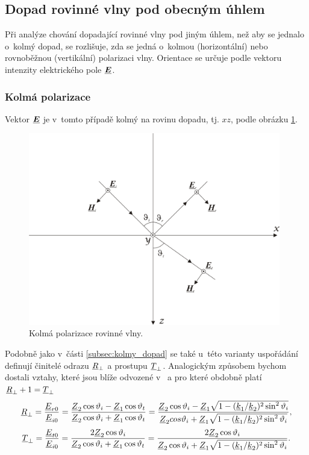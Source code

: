 \subsection{Dopad rovinné vlny pod obecným úhlem}
Při analýze chování dopadající rovinné vlny pod jiným úhlem, než aby se jednalo o~kolmý dopad, se rozlišuje, zda se jedná o~kolmou (horizontální) nebo rovnoběžnou (vertikální) polarizaci vlny. Orientace se určuje podle vektoru intenzity elektrického pole $\mbox{\underline{\boldmath$E$}}$.
\subsubsection*{Kolmá polarizace}
Vektor $\mbox{\underline{\boldmath$E$}}$ je v~tomto případě kolmý na rovinu dopadu, tj. $xz$, podle obrázku \ref{obr:evlny_kolma_polarizace}.
\begin{figure}[!h]
	\centering
	\includegraphics[width=11cm]{evlny_kolma_polarizace.png}
	\caption{Kolmá polarizace rovinné vlny. \cite{emp}}
	\label{obr:evlny_kolma_polarizace}
\end{figure}
Podobně jako v~části \ref{subsec:kolmy_dopad} se také u~této varianty uspořádání definují činitelé odrazu ${\underline{R}}_{\perp}$ a prostupu ${\underline{T}}_{\perp}$. Analogickým způsobem bychom dostali vztahy, které jsou blíže odvozené v~\cite[str. 94]{emp} a pro které obdobně platí ${\underline{R}}_{\perp} + 1 = {\underline{T}}_{\perp}$
\begin{equation}
	{\underline{R}}_{\perp} = \frac{{\underline{E}}_{r0}}{{\underline{E}}_{i0}} = \frac{{\underline{Z}}_{2}\cos\vartheta_{i}-{\underline{Z}}_{1}\cos\vartheta_{t}}{{\underline{Z}}_{2}\cos\vartheta_{i}+{\underline{Z}}_{1}\cos\vartheta_{t}} = \frac{{\underline{Z}}_{2}\cos\vartheta_{i}-{\underline{Z}}_{1}\sqrt{1-({\underline{k}}_{1}/{\underline{k}}_{2})^{2}\sin^{2}\vartheta_{i}}}{{\underline{Z}}_{2}cos\vartheta_{i}+{\underline{Z}}_{1}\sqrt{1-({\underline{k}}_{1}/{\underline{k}}_{2})^{2}\sin^{2}\vartheta_{i}}},
	\label{rce:evlny_cin_odrazu_kolma}
\end{equation}
\begin{equation}
	{\underline{T}}_{\perp} = \frac{{\underline{E}}_{t0}}{{\underline{E}}_{i0}} = \frac{2{\underline{Z}}_{2}\cos\vartheta_{i}}{{\underline{Z}}_{2}\cos\vartheta_{i}+{\underline{Z}}_{1}\cos\vartheta_{t}} = \frac{2{\underline{Z}}_{2}\cos\vartheta_{i}}{{\underline{Z}}_{2}\cos\vartheta_{i}+{\underline{Z}}_{1}\sqrt{1-({\underline{k}}_{1}/{\underline{k}}_{2})^{2}\sin^{2}\vartheta_{i}}}.
	\label{rce:evlny_cin_prostupu_kolma}
\end{equation}

